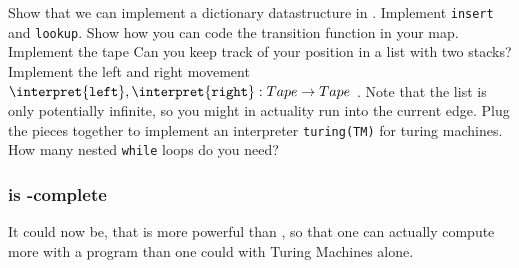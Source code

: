 \begin{Exercise}[title={Interpreter for \TM},label={exc:tm},difficulty=2]
	\Question Show that we can implement a dictionary datastructure in \WHILE. 
		Implement {\tt insert} and {\tt lookup}.
	\Question Show how you can code the transition function in your map.
	\Question Implement the tape
		\subQuestion Can you keep track of your position in a list with two stacks?
		\subQuestion Implement the left and right movement 
		$\interpret{{\tt left}},\interpret{{\tt right}} : Tape \rightarrow Tape$ . Note that the list is 
			only potentially infinite, so you might in actuality run into the current edge.
	\Question Plug the pieces together to implement an interpreter {\tt turing(TM)} for turing machines.
		\subQuestion How many nested {\tt while} loops do you need?
\end{Exercise}

\subsubsection{\TM  is \WHILE-complete}
It could now be, that \WHILE is more powerful than \TM, so that one can 
actually compute more with a \WHILE program than one could with Turing 
Machines alone.

